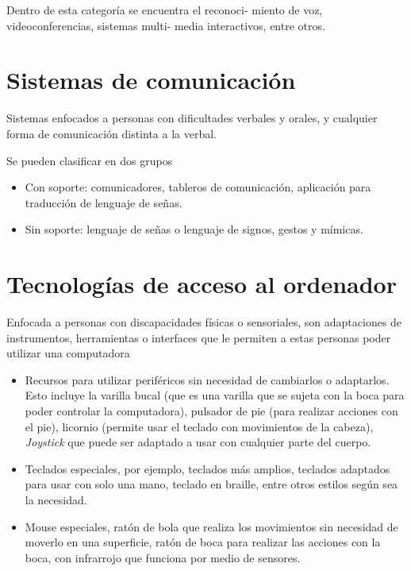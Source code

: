 \documentclass[12pt,spanish,Letterpaper,openany]{book}
\newcommand{\spaceminusmilis}{\vspace{-0.5mm}}
\begin{document}
Dentro de esta categoría se encuentra el reconoci-
miento de voz, videoconferencias, sistemas multi-
media interactivos, entre otros.

\hypertarget{sistemas-de-comunicaciuxf3n}{%
\section{Sistemas de comunicación}\label{sistemas-de-comunicaciuxf3n}}

Sistemas enfocados a personas con dificultades verbales y orales, y cualquier forma de comunicación distinta a la verbal.

Se pueden clasificar en dos grupos

\begin{itemize}
\item
  Con soporte: comunicadores, tableros de comunicación, aplicación para traducción de lenguaje de señas.
\item
  Sin soporte: lenguaje de señas o lenguaje de signos, gestos y mímicas.
\end{itemize}

\spaceminusmilis

\hypertarget{tecnologuxedas-de-acceso-al-ordenador}{%
\section{Tecnologías de acceso al ordenador}\label{tecnologuxedas-de-acceso-al-ordenador}}

\spaceminusmilis

Enfocada a personas con discapacidades físicas o sensoriales, son adaptaciones de instrumentos, herramientas o interfaces que le permiten a estas personas poder utilizar una computadora

\begin{itemize}
\item
  Recursos para utilizar periféricos sin necesidad de cambiarlos o adaptarlos. Esto incluye la varilla bucal (que es una varilla que se sujeta con la boca para poder controlar la computadora), pulsador de pie (para realizar acciones con el pie), licornio (permite usar el teclado con movimientos de la cabeza), \emph{Joystick} que puede ser adaptado a usar con cualquier parte del cuerpo.
\item
  Teclados especiales, por ejemplo, teclados más amplios, teclados adaptados para usar con solo una mano, teclado en braille, entre otros estilos según sea la necesidad.
\item
  Mouse especiales, ratón de bola que realiza los movimientos sin necesidad de moverlo en una superficie, ratón de boca para realizar las acciones con la boca, con infrarrojo que funciona por medio de sensores.
\end{itemize}
\end{document}
